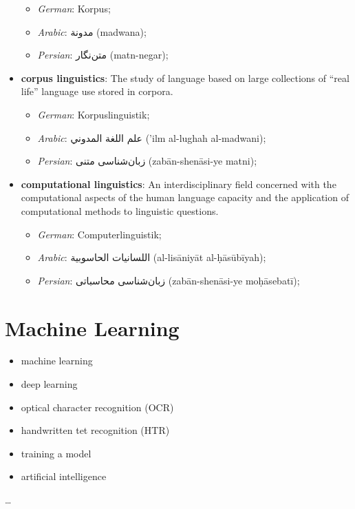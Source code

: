 \documentclass[
]{book}
\providecommand{\tightlist}{%
  \setlength{\itemsep}{0pt}\setlength{\parskip}{0pt}}
\begin{document}
\begin{itemize}
  \begin{itemize}
  \tightlist
  \item
    \emph{German}: Korpus;
  \item
    \emph{Arabic}: مدونة (madwana);
  \item
    \emph{Persian}: متن‌نگار (matn-negar);
  \end{itemize}
\item
  \textbf{corpus linguistics}: The study of language based on large collections of ``real life'' language use stored in corpora.

  \begin{itemize}
  \tightlist
  \item
    \emph{German}: Korpuslinguistik;
  \item
    \emph{Arabic}: علم اللغة المدوني ('ilm al-lughah al-madwani);
  \item
    \emph{Persian}: زبان‌شناسی متنی (zabān-shenāsi-ye matni);
  \end{itemize}
\item
  \textbf{computational linguistics}: An interdisciplinary field concerned with the computational aspects of the human language capacity and the application of computational methods to linguistic questions.

  \begin{itemize}
  \tightlist
  \item
    \emph{German}: Computerlinguistik;
  \item
    \emph{Arabic}: اللسانيات الحاسوبية (al-lisāniyāt al-ḥāsūbīyah);
  \item
    \emph{Persian}: زبان‌شناسی محاسباتی (zabān-shenāsi-ye moḥāsebatī);
  \end{itemize}
\end{itemize}

\hypertarget{machine-learning}{%
\section{Machine Learning}\label{machine-learning}}

\begin{itemize}
\tightlist
\item
  machine learning
\item
  deep learning
\item
  optical character recognition (OCR)
\item
  handwritten tet recognition (HTR)
\item
  training a model
\item
  artificial intelligence
\end{itemize}

\ldots{}
\end{document}
